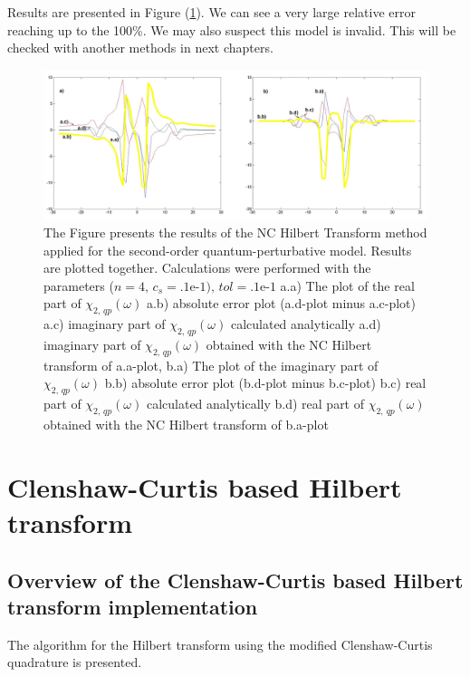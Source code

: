 \documentclass[12pt,twoside,a4paper]{article}
\numberwithin{equation}{subsection}
\numberwithin{figure}{subsection}
\begin{document}
Results are presented in Figure (\ref{fig:nc_quantum2}). We can see a very large relative error reaching up to the 100\%. We may also
suspect this model is invalid. This will be checked with another methods in next chapters.

\begin{figure} 
  \includegraphics[width=150mm]{img/nc_quantum2.png}
  \caption{The Figure presents the results of the NC Hilbert Transform method applied for the second-order
  quantum-perturbative model. Results are plotted together. Calculations were performed with the parameters ($n = 4, \, c_s = \mbox{.1e-1}),
  \,tol=\mbox{.1e-1}$ a.a) The plot of the real part of ${\chi_{2, \,qp}}(\omega )$
     a.b) absolute error plot (a.d-plot minus a.c-plot) 
     a.c) imaginary part of ${\chi_{2, \,qp}}(\omega )$ calculated analytically 
     a.d) imaginary part of ${\chi_{2, \,qp}}(\omega )$ obtained with the NC Hilbert transform of a.a-plot, 
     b.a) The plot of the imaginary part of ${\chi_{2, \,qp}}(\omega )$ 
     b.b) absolute error plot (b.d-plot minus b.c-plot) 
     b.c) real part of $\chi_{2, \, qp} (\omega )$ calculated analytically 
     b.d) real part of $\chi_{2, \, qp} (\omega )$ obtained with the NC Hilbert transform of b.a-plot 
     \label{fig:nc_quantum2}
     }
\end{figure}
 
\section{Clenshaw-Curtis based Hilbert transform} \label{chap:hcc}

\subsection{Overview of the Clenshaw-Curtis based Hilbert transform implementation} \label{chap:hcc_overview}

The algorithm for the Hilbert transform using the modified Clenshaw-Curtis quadrature is presented. 
\end{document}

